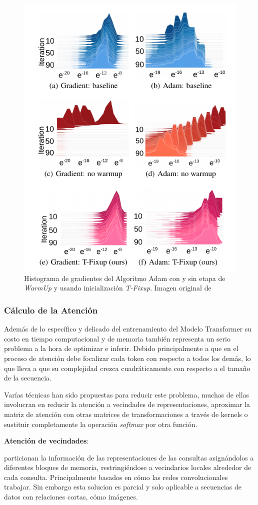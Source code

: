 \begin{figure}[ht!]
    \centering
    \includegraphics[width=0.5 \textwidth]{Chapters/2. Transformer/Figures/transformer/tfixup.png}
    \caption{Histograma de gradientes del Algoritmo Adam con y sin etapa de \textit{WarmUp} y
    usando inicialización \textit{T-Fixup}. Imagen original de \citeauthor{pmlr-v119-huang20f}}
    \label{fig:t-fixup}
\end{figure}

\subsubsection{Cálculo de la Atención}

Además de lo específico y delicado del entrenamiento del Modelo Transformer su costo en tiempo
computacional y de memoria también representa un serio problema a la hora de optimizar e inferir.
Debido principalmente a que en el proceso de atención debe focalizar cada token con respecto a todos
los demás, lo que lleva a que su complejidad crezca cuadráticamente con respecto a el tamaño de la
secuencia.

Varías técnicas han sido propuestas para reducir este problema, muchas de ellas involucran en reducir
la atención a vecindades de representaciones, aproximar la matriz de atención con otras matrices de
transformaciones a través de kernels o sustituir completamente la operación \textit{softmax}
por otra función.

\textbf{Atención de vecindades}:

\citeauthor{DBLP:journals/corr/abs-1802-05751} particionan la información de las representaciones de
las consultas asignándolos a diferentes bloques de memoria, restringiéndose a vecindarios locales
alrededor de cada consulta. Principalmente basados en cómo las redes convolucionales trabajar. Sin
embargo esta solucion es parcial y solo aplicable a secuencias de datos con relaciones cortas, cómo
imágenes.

